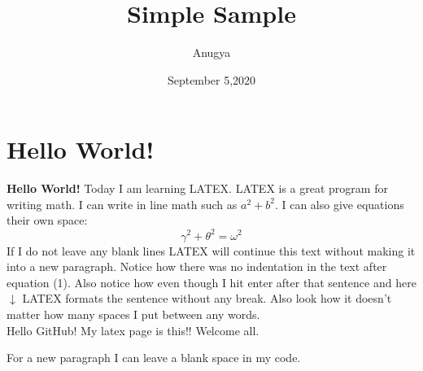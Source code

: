\documentclass[10 pt]{article}
\begin{document}
\title{Simple Sample}
\author{Anugya}
\date{September 5,2020}
\maketitle
\section{Hello World!}
\textbf{Hello World!}
Today I am learning {\Large L}A{\Large T}E{\Large X}. LATEX is a great program for writing math. I can write in line math such as $a^2+b^2$. I can also give equations their own space:
\begin{equation}
\gamma^2+\theta^2=\omega^2
\end{equation}
If I do not leave any blank lines LATEX will continue this text without making it into a new paragraph. Notice how there was no indentation in the text after equation (1). Also notice how even though I hit enter after that sentence and here $\downarrow$ LATEX formats the sentence without any break. Also look how it doesn't
matter how many spaces I put between any words. \\ 
Hello GitHub! My latex page is this!! Welcome all.

For a new paragraph I can leave a blank space in my code.
\end{document}
